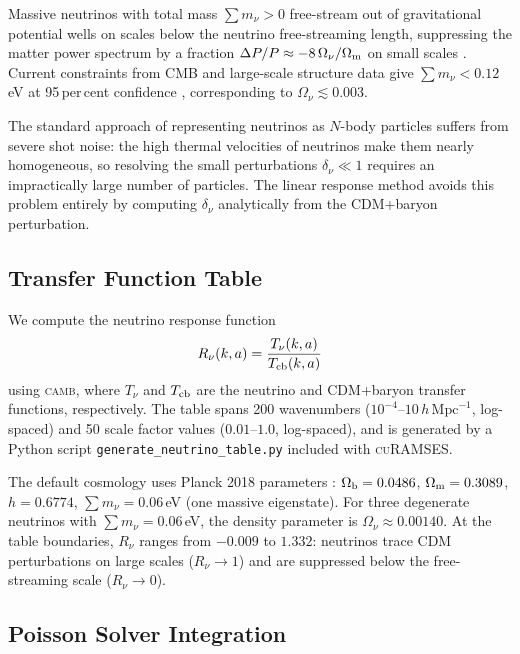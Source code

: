 \documentclass[fleqn,usenatbib]{mnras}
\newcommand{\curamses}{\textsc{cuRAMSES}}
\newcommand{\camb}{\textsc{camb}}
\newcommand{\code}[1]{\texttt{#1}}
\newcommand{\Onu}{\Omega_\nu}
\newcommand{\Om}{\Omega_{\rm m}}
\newcommand{\Rnu}{R_\nu}
\begin{document}
Massive neutrinos with total mass $\sum m_\nu > 0$ free-stream out of
gravitational potential wells on scales below the neutrino free-streaming
length, suppressing the matter power spectrum by a fraction
$\Delta P/P \approx -8\,\Onu/\Om$ on small scales
\citep{Lesgourgues2006}.  Current constraints from CMB and
large-scale structure data give $\sum m_\nu < 0.12$\,eV at 95\,per\,cent
confidence \citep{PlanckCollaboration2020}, corresponding to
$\Onu \lesssim 0.003$.

The standard approach of representing neutrinos as $N$-body
particles \citep{Brandbyge2008,Viel2010} suffers from severe shot
noise: the high thermal velocities of neutrinos make them
nearly homogeneous, so resolving the small perturbations
$\delta_\nu \ll 1$ requires an impractically large number of
particles.  The linear response method \citep{AliHaimoud2013,Bird2018}
avoids this problem entirely by computing $\delta_\nu$ analytically
from the CDM+baryon perturbation.

\subsection{Transfer Function Table}
\label{sec:nu_table}

We compute the neutrino response function
\begin{equation}
\Rnu(k,a) = \frac{T_\nu(k,a)}{T_{\rm cb}(k,a)}
\label{eq:rnu_def}
\end{equation}
using \camb, where $T_\nu$ and $T_{\rm cb}$ are the neutrino and
CDM+baryon transfer functions, respectively.  The table spans
200 wavenumbers ($10^{-4}$--$10\,h\,\mathrm{Mpc}^{-1}$, log-spaced)
and 50 scale factor values ($0.01$--$1.0$, log-spaced), and is
generated by a Python script \code{generate\_neutrino\_table.py}
included with \curamses.

The default cosmology uses Planck 2018 parameters
\citep{PlanckCollaboration2020}: $\Omega_{\rm b}=0.0486$,
$\Om=0.3089$, $h=0.6774$, $\sum m_\nu=0.06$\,eV (one massive
eigenstate).  For three degenerate neutrinos with $\sum m_\nu=0.06$\,eV,
the density parameter is $\Onu \approx 0.00140$.  At the table
boundaries, $\Rnu$ ranges from $-0.009$ to $1.332$: neutrinos
trace CDM perturbations on large scales ($\Rnu \to 1$) and are
suppressed below the free-streaming scale ($\Rnu \to 0$).

\subsection{Poisson Solver Integration}
\label{sec:nu_poisson}
\end{document}
